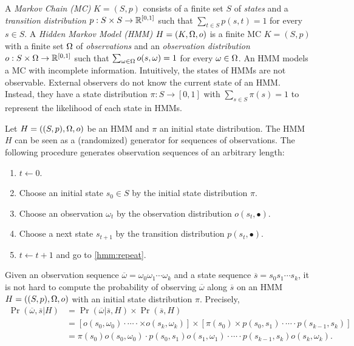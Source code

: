 
A \emph{Markov Chain (MC)} $K = (S, p)$ consists of a finite set $S$ of
\emph{states} and a \emph{transition distribution} $p : S \times S
\rightarrow \mathbb{R}^{[0, 1]}$ such that $\sum_{t \in S} p (s, t) = 1$ for every
$s \in S$.
A \emph{Hidden Markov Model (HMM)} $H = (K, \Omega, o)$ is a finite MC $K =
(S, p)$ with a finite set $\Omega$ of \emph{observations} and an
\emph{observation distribution} $o : S \times \Omega \rightarrow \mathbb{R}^{[0, 1]}$
such that $\sum_{\omega \in \Omega} o (s, \omega) = 1$ for every $\omega \in
\Omega$. An HMM models a MC with incomplete information. Intuitively,
the states of HMMs are not observable. External observers do not know
the current state of an HMM. Instead, they have a state distribution
$\pi : S \rightarrow [0, 1]$ with $\sum_{s \in S} \pi (s) = 1$
to represent the likelihood of each state in HMMs.

Let $H = ((S, p), \Omega, o)$ be an HMM and $\pi$ an initial state
distribution. The HMM $H$ can be seen as a (randomized) generator for
sequences of observations. The following procedure generates
observation sequences of an arbitrary length:
\begin{enumerate}
\item $t \leftarrow 0$.
\item Choose an initial state $s_0 \in S$ by the initial state
  distribution $\pi$.
\item \label{hmm:repeat}
  Choose an observation $\omega_t$ by the observation distribution
  $o (s_t, \bullet)$.
\item Choose a next state $s_{t+1}$ by the transition distribution
  $p (s_t, \bullet)$.
\item $t \leftarrow t + 1$ and go to \ref{hmm:repeat}.
\end{enumerate}

Given an observation sequence $\overline{\omega} =
\omega_0\omega_1\cdots\omega_k$ and a state sequence $\overline{s} =
s_0s_1\cdots s_k$, it is not hard to compute the probability of
observing $\overline{\omega}$ along $\overline{s}$ on an HMM $H = ((S,
p), \Omega, o)$ with an initial state distribution $\pi$. Precisely,
\begin{align}
  \Pr (\overline{\omega}, \overline{s} | H)
  & = \Pr (\overline{\omega} | \overline{s}, H) \times \Pr(\overline{s}, H)
    \nonumber
  \\
  & = [o (s_0, \omega_0) \cdot \cdots \cdot
    \times o (s_k, \omega_k)] \times
      [\pi (s_0) \times p (s_0, s_1) \cdot \cdots
    \cdot p (s_{k-1}, s_k)]
    \nonumber
  \\
  & = \pi (s_0) o (s_0, \omega_0) \cdot
    p (s_0, s_1) o (s_1, \omega_1) \cdot \cdots \cdot
    p (s_{k-1}, s_k) o (s_k, \omega_k).
    \label{eqn:prob-obs-state}
\end{align}

